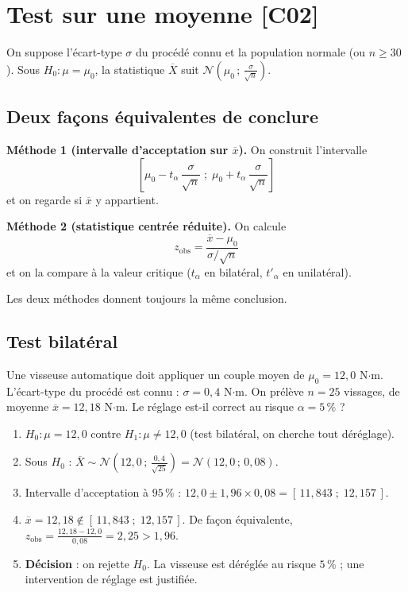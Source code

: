 \documentclass[a4paper,11pt]{article}
\begin{document}
\section{Test sur une moyenne \hfill {\normalsize\color{uimmred}[C02]}}

On suppose l'écart-type $\sigma$ du procédé connu et la population normale (ou $n \geq 30$). Sous $H_0 : \mu = \mu_0$, la statistique $\overline{X}$ suit $\mathcal{N}\!\left(\mu_0\,;\,\frac{\sigma}{\sqrt{n}}\right)$.

\subsection{Deux façons équivalentes de conclure}

\begin{methode}
\textbf{Méthode 1 (intervalle d'acceptation sur $\overline{x}$).} On construit l'intervalle
\[
\left[\mu_0 - t_\alpha\,\frac{\sigma}{\sqrt{n}}\;;\;\mu_0 + t_\alpha\,\frac{\sigma}{\sqrt{n}}\right]
\]
et on regarde si $\overline{x}$ y appartient.

\textbf{Méthode 2 (statistique centrée réduite).} On calcule
\[
z_{\text{obs}} = \frac{\overline{x} - \mu_0}{\sigma/\sqrt{n}}
\]
et on la compare à la valeur critique ($t_\alpha$ en bilatéral, $t'_\alpha$ en unilatéral).

Les deux méthodes donnent toujours la même conclusion.
\end{methode}

\subsection{Test bilatéral}

\begin{exemple}
Une visseuse automatique doit appliquer un couple moyen de $\mu_0 = 12{,}0$ N$\cdot$m. L'écart-type du procédé est connu : $\sigma = 0{,}4$ N$\cdot$m. On prélève $n = 25$ vissages, de moyenne $\overline{x} = 12{,}18$ N$\cdot$m. Le réglage est-il correct au risque $\alpha = 5\,\%$ ?
\begin{enumerate}
  \item $H_0 : \mu = 12{,}0$ \quad contre \quad $H_1 : \mu \neq 12{,}0$ (test bilatéral, on cherche tout déréglage).
  \item Sous $H_0$ : $\overline{X} \sim \mathcal{N}\!\left(12{,}0\,;\,\frac{0{,}4}{\sqrt{25}}\right) = \mathcal{N}(12{,}0\,;\,0{,}08)$.
  \item Intervalle d'acceptation à $95\,\%$ : $12{,}0 \pm 1{,}96 \times 0{,}08 = [\,11{,}843\;;\;12{,}157\,]$.
  \item $\overline{x} = 12{,}18 \notin [\,11{,}843\;;\;12{,}157\,]$. De façon équivalente, $z_{\text{obs}} = \frac{12{,}18 - 12{,}0}{0{,}08} = 2{,}25 > 1{,}96$.
  \item \textbf{Décision} : on rejette $H_0$. La visseuse est déréglée au risque $5\,\%$ ; une intervention de réglage est justifiée.
\end{enumerate}
\end{exemple}
\end{document}

